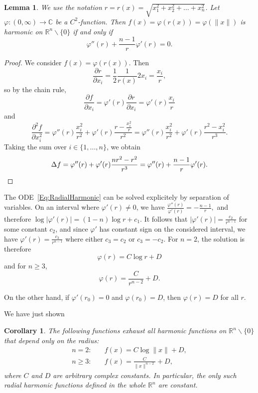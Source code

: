 \documentclass[12pt, oneside, a4paper]{article}
\newtheorem{lem}[thm]{Lemma}
\newtheorem{cor}[thm]{Corollary}
\theoremstyle{dfn}
\def\Rbb{\ensuremath{\mathbb{R}}}
\providecommand{\norm}[1]{\lVert#1\rVert}
\newcommand{\Com}{\mathbb{C}}
\providecommand{\abs}[1]{\lvert#1\rvert}
\begin{document}
\begin{lem}
We use the notation $r = r(x) = \sqrt{x^2_1 + x^2_2 + \dots + x^2_n}$. Let $\varphi \colon (0,\infty) \to \Com$ be a $C^2$-function. Then $f(x) = \varphi(r(x)) = \varphi(\norm{x})$ is harmonic on $\Rbb^n \smallsetminus \{0\}$ if and only if
\begin{equation}\label{Eq:RadialHarmonic}
\varphi''(r) + \frac{n-1}{r}\varphi'(r) = 0.
\end{equation}
\end{lem}

\begin{proof}
We consider $f(x) = \varphi(r(x))$. Then
\[
\frac{\partial r}{\partial x_i}
= \frac{1}{2} \frac{1}{r(x)} 2x_i
= \frac{x_i}{r},
\]
so by the chain rule,
\[
\frac{\partial f}{\partial x_i}
= \varphi'(r) \frac{\partial r}{\partial x_i}
= \varphi'(r) \frac{x_i}{r}
\]
and
\[
\frac{\partial^2 f}{\partial x_i^2}
= \varphi''(r) \frac{x^2_i}{r^2} + \varphi'(r) \frac{r - \frac{x^2_i}{r}}{r^2}
= \varphi''(r) \frac{x^2_i}{r^2} + \varphi'(r) \frac{r^2 - x^2_i}{r^3}.
\]
Taking the sum over $i \in \{1,\dots,n\}$, we obtain
\[
\Delta f = \varphi''(r) + \varphi'(r) \frac{nr^2 - r^2}{r^3}
= \varphi''(r) + \frac{n - 1}{r} \varphi'(r).
\qedhere
\]
\end{proof}

The ODE~\eqref{Eq:RadialHarmonic} can be solved explicitely by separation of variables. On an interval where $\varphi'(r) \neq 0$, we have $
\frac{\varphi''(r)}{\varphi'(r)} = - \frac{n-1}{r},
$
and therefore
$
\log\abs{\varphi'(r)} = (1-n) \log r + c_1
$.
It follows that
$
\abs{\varphi'(r)} = \frac{c_2}{r^{n-1}}
$
for some constant $c_2$, and since $\varphi'$ has constant sign on the considered interval, we have
$
\varphi'(r) = \frac{c_3}{r^{n-1}}
$
where either $c_3 = c_2$ or $c_3 = - c_2$.
For $n=2$, the solution is therefore
\[
\varphi(r) = C \log r + D
\]
and for $n \geqslant 3$,
\[
\varphi(r) = \frac{C}{r^{n-2}} + D.
\]

On the other hand, if $\varphi'(r_0) = 0$ and $\varphi(r_0) = D$, then $\varphi(r) = D$ for all $r$.

We have just shown

\begin{cor}\label{Cor:HarmonicRadialFcts}
The following functions exhaust all harmonic functions on $\Rbb^n \smallsetminus \{0\}$ that depend only on the radius:
\begin{align*}
	n = 2\colon \quad & f(x) = C \log \norm{x} + D, \\
	n \geqslant 3\colon \quad & f(x) = \frac{C}{\norm{x}^{n-2}} + D,
\end{align*}
where $C$ and $D$ are arbitrary complex constants.
In particular, the only such radial harmonic functions defined in the whole $\Rbb^n$ are constant.
\end{cor}
\end{document}
